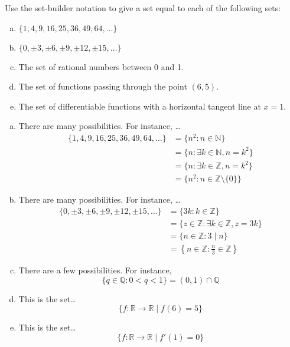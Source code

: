 \documentclass[11pt,letterpaper]{article}
\begin{document}
\newpage





 Use the set-builder notation to give a set equal to each of the following sets:
        \begin{enumerate}[(a)]
        \item $\{ 1, 4, 9, 16, 25, 36, 49, 64, \ldots \}$
        \item $\{ 0, \pm 3, \pm 6, \pm 9, \pm 12, \pm 15, \ldots \}$
        \item The set of rational numbers between 0 and 1.  
        \item The set of functions passing through the point $(6, 5)$. 
        \item The set of differentiable functions with a horizontal tangent line at $x= 1$.
        \end{enumerate} \pspace

\sol
\begin{enumerate}[(a)]
\item There are many possibilities. For instance, \dots
	\[
	\begin{aligned}
	\{ 1, 4, 9, 16, 25, 36, 49, 64, \ldots \}&= \{ n^2 \colon n \in \mathbb{N} \} \\
	&= \{ n \colon \exists k \in \mathbb{N}, n= k^2 \} \\
	&= \{ n \colon \exists k \in \mathbb{Z}, n= k^2 \} \\
	&= \{ n^2 \colon n \in \mathbb{Z} \setminus \{0\} \}
	\end{aligned}
	\]

\item There are many possibilities. For instance, \dots
	\[
	\begin{aligned}
	\{ 0, \pm 3, \pm 6, \pm 9, \pm 12, \pm 15, \ldots \}&= \{ 3k \colon k \in \mathbb{Z} \} \\
	&= \{ z \in \mathbb{Z} \colon \exists k \in \mathbb{Z}, z= 3k \} \\
	&= \{ n \in \mathbb{Z} \colon 3 \mid n \} \\
	&= \left\{ n \in \mathbb{Z} \colon \frac{n}{3} \in \mathbb{Z} \right\}
	\end{aligned}
	\]

\item There are a few possibilities. For instance, 
	\[
	\{ q \in \mathbb{Q} \colon 0 < q < 1 \}= (0, 1) \cap \mathbb{Q}
	\]

\item This is the set\dots
	\[
	\{ f: \mathbb{R} \to \mathbb{R} \;|\; f(6)= 5 \}
	\]

\item This is the set\dots
	\[
	\{ f: \mathbb{R} \to \mathbb{R} \;|\; f'(1)= 0 \}
	\]
\end{enumerate}
\end{document}
